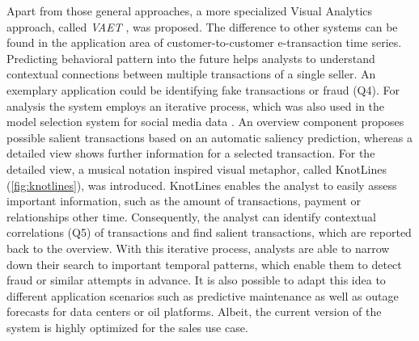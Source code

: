 \documentclass[electronic]{vgtc}             %
\begin{document}
Apart from those general approaches, a more specialized Visual Analytics approach, called \textit{VAET} \cite{Xie:2014}, was proposed.
The difference to other systems can be found in the application area of customer-to-customer e-transaction time series.
Predicting behavioral pattern into the future helps analysts to understand contextual connections between multiple transactions of a single seller.
An exemplary application could be identifying fake transactions or fraud (Q4).
For analysis the system employs an iterative process, which was also used in the model selection system for social media data \cite{koepp:2014}.
An overview component proposes possible salient transactions based on an automatic saliency prediction, whereas a detailed view shows further information for a selected transaction.
For the detailed view, a musical notation inspired visual metaphor, called KnotLines (\autoref{fig:knotlines}), was introduced.
KnotLines enables the analyst to easily assess important information, such as the amount of transactions, payment or relationships other time. 
Consequently, the analyst can identify contextual correlations (Q5) of transactions and find salient transactions, which are reported back to the overview. 
With this iterative process, analysts are able to narrow down their search to important temporal patterns, which enable them to detect fraud or similar attempts in advance. 
It is also possible to adapt this idea to different application scenarios such as predictive maintenance as well as outage forecasts for data centers or oil platforms.
Albeit, the current version of the system is highly optimized for the sales use case. 
\end{document}
